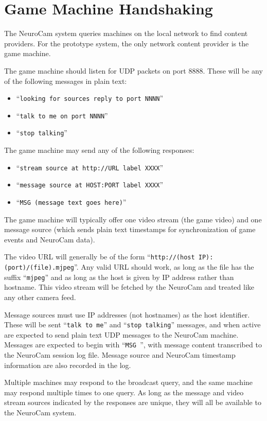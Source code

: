 
\chapter{Game Machine Handshaking}
\label{handshake}

The NeuroCam system queries machines on the local network to find content
providers. For the prototype system, the only network content provider is
the game machine.

The game machine should listen for UDP packets on port 8888. These will
be any of the following messages in plain text:
\begin{itemize}
\item ``\verb+looking for sources reply to port NNNN+''
\item ``\verb+talk to me on port NNNN+''
\item ``\verb+stop talking+''
\end{itemize}

The game machine may send any of the following responses:
\begin{itemize}
\item ``\verb+stream source at http://URL label XXXX+''
\item ``\verb+message source at HOST:PORT label XXXX+''
\item ``\verb+MSG (message text goes here)+''
\end{itemize}

The game machine will typically offer one video stream (the game video) and
one message source (which sends plain text timestamps for synchronization of
game events and NeuroCam data).

The video URL will generally be of the form
``\verb+http://(host IP):(port)/(file).mjpeg+''. Any valid URL should work,
as long as the file has the suffix ``\verb+mjpeg+'' and as long as the
host is given by IP address rather than hostname. This video stream will be
fetched by the NeuroCam and treated like any other camera feed.

Message sources must use IP addresses (not hostnames) as the host identifier.
These will be sent ``\verb+talk to me+'' and ``\verb+stop talking+''
messages, and when active are expected to send plain text UDP messages to
the NeuroCam machine. Messages are expected to begin with ``\verb+MSG +'',
with message content transcribed to the NeuroCam session log file. Message
source and NeuroCam timestamp information are also recorded in the log.

Multiple machines may respond to the broadcast query, and the same machine
may respond multiple times to one query. As long as the message and video
stream sources indicated by the responses are unique, they will all be
available to the NeuroCam system.

%
